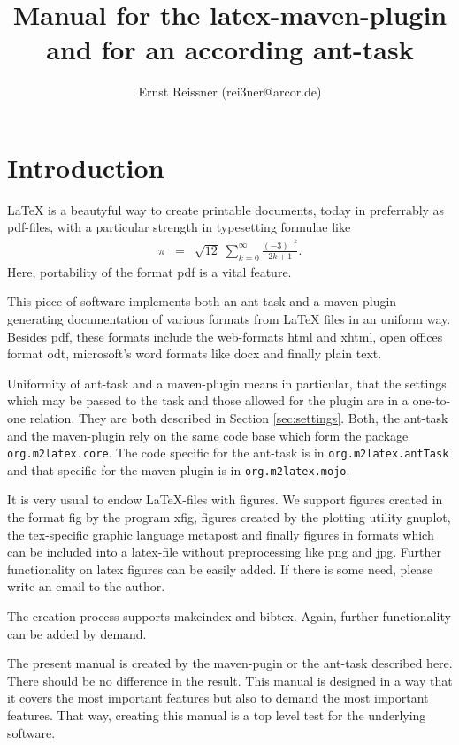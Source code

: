 \documentclass[12pt]{article}
\title{Manual for the latex-maven-plugin and for an according ant-task }
\author{Ernst Reissner (rei3ner@arcor.de)}
\begin{document}
\maketitle

\tableofcontents
\listoffigures
\listoftables


\section{Introduction}

LaTeX is a beautyful way to create printable documents, 
today in preferrably as \gls{pdf}-files, 
with a particular strength in typesetting formulae like 
%
\begin{eqnarray*}
\pi & = & \sqrt{12}\;\sum^\infty_{k=0} \frac{(-3)^{-k}}{2k+1}. 
\end{eqnarray*}
%
Here, portability of the format \gls{pdf} is a vital feature. 

This piece of software implements both an ant-task and a maven-plugin 
generating documentation of various formats from LaTeX files 
in an uniform way. 
Besides \gls{pdf}, these formats include the web-formats \gls{html} 
and \gls{xhtml}, 
open offices format \gls{odt}, microsoft's word formats like \gls{docx} 
and finally plain text. 

Uniformity of ant-task and a maven-plugin means in particular, 
that the settings which may be passed to the task 
and those allowed for the plugin are in a one-to-one relation. 
They are both described in Section \ref{sec:settings}. 
Both, the ant-task and the maven-plugin rely on the same code base 
which form the package {\tt org.m2latex.core}. 
The code specific for the ant-task is in {\tt org.m2latex.antTask} 
and that specific for the maven-plugin is in {\tt org.m2latex.mojo}. 

It is very usual to endow LaTeX-files with figures. 
We support figures created in the format \gls{fig} by the program xfig, 
figures created by the plotting utility gnuplot, 
the tex-specific graphic language metapost 
and finally figures in formats which can be included into a latex-file 
without preprocessing like \gls{png} and \gls{jpg}. 
Further functionality on latex figures can be easily added. 
If there is some need, please write an email to the author. 

The creation process supports makeindex and bibtex. 
Again, further functionality can be added by demand. 

The present manual is created by the maven-pugin or the ant-task 
described here. 
There should be no difference in the result. 
This manual is designed in a way that it covers the most important features 
but also to demand the most important features. 
That way, creating this manual is a top level test 
for the underlying software. 
\end{document}
